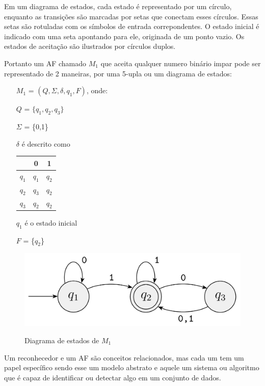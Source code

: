 Em um diagrama de estados, cada estado é representado por um círculo, enquanto as transições são marcadas por setas que conectam esses círculos. Essas setas são rotuladas com os símbolos de entrada correpondentes. O estado inicial é indicado com uma seta apontando para ele, originada de um ponto vazio. Os estados de aceitação são ilustrados por círculos duplos.

Portanto um \ac{AF} chamado $M_1$ que aceita qualquer numero binário impar pode ser representado de 2 maneiras,  por uma 5-upla ou um diagrama de estados:

\begin{itemize}
    \item[$M_1$] = $(Q, \Sigma, \delta, q_1, F)$, onde:
    \item[$Q$] = $\{q_1, q_2, q_3\}$
    \item[$\Sigma$] = \{0,1\}
    \item [$\delta$] é descrito como
    \item [ ]
        \begin{tabular}{c|cc}
            & 0 & 1 \\ \hline
            $q_1$ & $q_1$ & $q_2$ \\
            $q_2$ & $q_3$ & $q_2$ \\
            $q_3$ & $q_2$ & $q_2$ \\
        \end{tabular}
    \item[$q_1$] é o estado inicial
    \item[$F$] = \{$q_2$\}
\end{itemize}

\begin{figure}[!htb]
	\centering
    \caption{Diagrama de estados de $M_1$}
	\includegraphics[scale=1]{figuras/AFD/m1.png}
	\label{fig:Diagrama de estados}
\end{figure}

Um reconhecedor e um \ac{AF} são conceitos relacionados, mas cada um tem um papel específico sendo esse um modelo abstrato e aquele um sistema ou algoritmo que é capaz de identificar ou detectar algo em um conjunto de dados.





